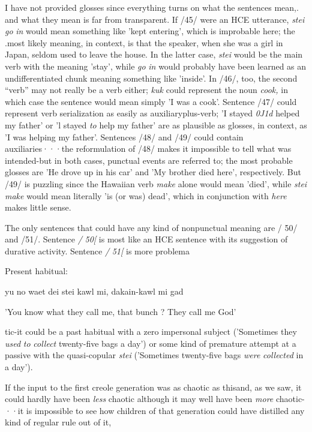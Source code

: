 I have not provided glosses since everything turns on what the sentences mean,. and what they mean is far from transparent. If /45/ were an HCE utterance, \textit{stei} \textit{go} \textit{in} would mean something like 'kept entering',
which is improbable here; the .most likely meaning, in context, is that the speaker, when she was a girl in Japan, seldom used to leave the house. In the latter case, \textit{stei} would be the main verb with the meaning
'stay', while \textit{go} \textit{in} would probably have been learned as an undifferenti\-ated chunk meaning something like 'inside'. In /46/, too, the second ``verb'' may not really be a verb either; \textit{kuk} could represent the noun \textit{cook,} in which case the sentence would mean simply 'I was a cook'. Sentence /47/ could represent verb serialization as easily as auxiliary\-plus-verb; 'I stayed \textit{0J1d} helped my father' or 'l stayed \textit{to} help my father' are as plausible as glosses, in context, as 'I was helping my father'. Sentences /48/ and /49/ could contain auxiliaries···the reformu\-lation of /48/ makes it impossible to tell what was intended-but in both cases, punctual events are referred to; the most probable glosses are 'He drove up in his car' and 'My brother died here', respectively. But /49/ is puzzling since the Hawaiian verb \textit{make} alone would mean 'died', while \textit{stei} \textit{make} would mean literally 'is (or was) dead', which in conjunction with \textit{here} makes little sense.

The only sentences that could have any kind of nonpunctual meaning are / 50/ and /51/. Sentence \textit{/} \textit{50[} is most like an HCE sentence with its suggestion of durative activity. Sentence \textit{/} \textit{51[} is more problema\-


\ea\label{ex:54}
Present habitual:
\glt
\z

yu no waet dei stei kawl mi, dakain-kawl mi gad

'You know what they call me, that bunch ? They call me God'

tic-it could be a past habitual with a zero impersonal subject ('Some\-times they \textit{used} \textit{to} \textit{collect} twenty-five bags a day') or some kind of premature attempt at a passive with the quasi-copular \textit{stei} ('Sometimes twenty-five bags \textit{were} \textit{collected} in a day').

If the input to the first creole generation was as chaotic as this\-and, as we saw, it could hardly have been \textit{less} chaotic although it may well have been \textit{more} chaotic-··it is impossible to see how children of that generation could have distilled any kind of regular rule out of it,

